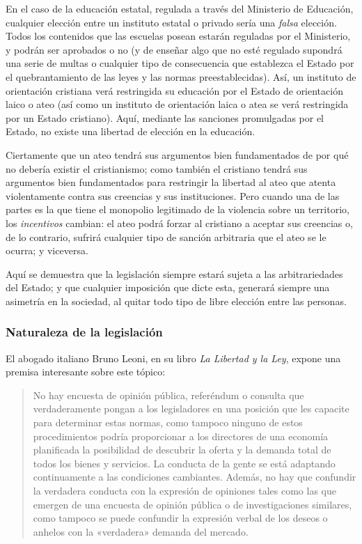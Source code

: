 \documentclass[12pt,a4paper,twoside]{book}
\begin{document}
En el caso de la educación estatal, regulada a través del Ministerio de Educación, cualquier elección entre un instituto estatal o privado sería una \textit{falsa} elección. Todos los contenidos que las escuelas posean estarán reguladas por el Ministerio, y podrán ser aprobados o no (y de enseñar algo que no esté regulado supondrá una serie de multas o cualquier tipo de consecuencia que establezca el Estado por el quebrantamiento de las leyes y las normas preestablecidas). Así, un instituto de orientación cristiana verá restringida su educación por el Estado de orientación laico o ateo (así como un instituto de orientación laica o atea se verá restringida por un Estado cristiano). Aquí, mediante las sanciones promulgadas por el Estado, no existe una libertad de elección en la educación. 

Ciertamente que un ateo tendrá sus argumentos bien fundamentados de por qué no debería existir el cristianismo; como también el cristiano tendrá sus argumentos bien fundamentados para restringir la libertad al ateo que atenta violentamente contra sus creencias y sus instituciones. Pero cuando una de las partes es la que tiene el monopolio legitimado de la violencia sobre un territorio, los \textit{incentivos} cambian: el ateo podrá forzar al cristiano a aceptar sus creencias o, de lo contrario, sufrirá cualquier tipo de sanción arbitraria que el ateo se le ocurra; y viceversa.

Aquí se demuestra que la legislación siempre estará sujeta a las arbitrariedades del Estado; y que cualquier imposición que dicte esta, generará siempre una asimetría en la sociedad, al quitar todo tipo de libre elección entre las personas.

\subsubsection{Naturaleza de la legislación}
El abogado italiano Bruno Leoni, en su libro \textit{La Libertad y la Ley}, expone una premisa interesante sobre este tópico:

\begin{quotation}
No hay encuesta de opinión pública, referéndum o consulta que verdaderamente pongan a los legisladores en una posición que les capacite para determinar estas normas, como tampoco ninguno de estos procedimientos podría proporcionar a los directores de una economía planificada la posibilidad de descubrir la oferta y la demanda total de todos los bienes y servicios. La conducta de la gente se está adaptando continuamente a las condiciones cambiantes. Además, no hay que confundir la verdadera conducta con la expresión de opiniones tales como las que emergen de una encuesta de opinión pública o de investigaciones similares, como tampoco se puede confundir la expresión verbal de los deseos o anhelos con la «verdadera» demanda del mercado. \cite[pág. 37]{brunoleoni:ley}
\end{quotation}
\end{document}
